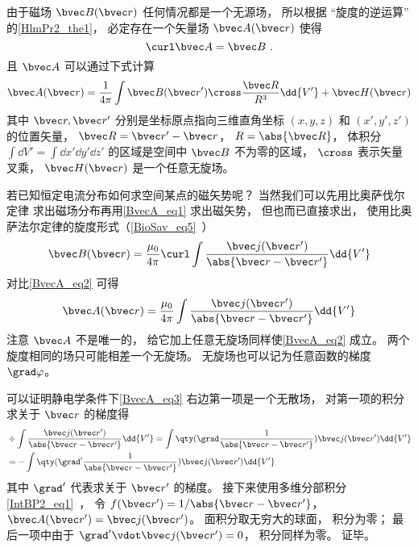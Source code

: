 
\begin{issues}
\issueDraft
{}
\end{issues}


由于磁场 $\bvec B(\bvec r)$ 任何情况都是一个无源场， 所以根据 “旋度的逆运算” 的\autoref{HlmPr2_the1}， 必定存在一个矢量场 $\bvec A(\bvec r)$ 使得
\begin{equation}\label{BvecA_eq2}
\curl \bvec A = \bvec B~.
\end{equation}
且 $\bvec A$ 可以通过下式计算
\begin{equation}\label{BvecA_eq1}
\bvec A(\bvec r) = \frac{1}{4\pi} \int \bvec B(\bvec r') \cross \frac{\bvec R}{R^3} \dd{V'} + \bvec H(\bvec r)
\end{equation}
其中 $\bvec r, \bvec r'$ 分别是坐标原点指向三维直角坐标 $(x, y, z)$ 和 $(x', y', z')$ 的位置矢量， $\bvec R = \bvec r' - \bvec r$， $R = \abs{\bvec R}$， 体积分 $\int\dd{V'} = \int\dd{x'}\dd{y'}\dd{z'}$ 的区域是空间中 $\bvec B$ 不为零的区域， $\cross$ 表示矢量叉乘， $\bvec H(\bvec r)$ 是一个任意无旋场。

若已知恒定电流分布如何求空间某点的磁矢势呢？ 当然我们可以先用比奥萨伐尔定律 求出磁场分布再用\autoref{BvecA_eq1} 求出磁矢势， 但也而已直接求出， 使用比奥萨法尔定律的旋度形式（\autoref{BioSav_eq5}~）
\begin{equation}
\bvec B(\bvec r) = \frac{\mu_0}{4\pi} \curl \int \frac{\bvec j(\bvec r')}{\abs{\bvec r - \bvec r'}}\dd{V'}
\end{equation}
对比\autoref{BvecA_eq2} 可得
\begin{equation}\label{BvecA_eq3}
\bvec A(\bvec r) = \frac{\mu_0}{4\pi} \int \frac{\bvec j(\bvec r')}{\abs{\bvec r - \bvec r'}}\dd{V'}
\end{equation}
注意 $\bvec A$ 不是唯一的， 给它加上任意无旋场同样使\autoref{BvecA_eq2} 成立。 两个旋度相同的场只可能相差一个无旋场。 无旋场也可以记为任意函数的梯度 $\grad \varphi$。

可以证明静电学条件下\autoref{BvecA_eq3} 右边第一项是一个无散场， 对第一项的积分求关于 $\bvec r$ 的梯度得
\begin{equation}
\begin{aligned}
&\div \int \frac{\bvec j(\bvec r')}{\abs{\bvec r - \bvec r'}}\dd{V'} = 
\int \qty(\grad\frac{1}{\abs{\bvec r - \bvec r'}}) \bvec j(\bvec r') \dd{V'}\\
&= -\int \qty(\grad' \frac{1}{\abs{\bvec r - \bvec r'}}) \bvec j(\bvec r') \dd{V'}
\end{aligned}
\end{equation}
其中 $\grad'$ 代表求关于 $\bvec r'$ 的梯度。 接下来使用多维分部积分\autoref{IntBP2_eq1}~， 令 $f(\bvec r') = 1/\abs{\bvec r - \bvec r'}$， $\bvec A(\bvec r') = \bvec j(\bvec r')$。 面积分取无穷大的球面， 积分为零； 最后一项中由于 $\grad' \vdot \bvec j(\bvec r') = 0$， 积分同样为零。 证毕。

